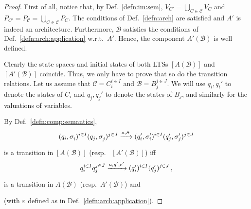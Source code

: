 \documentclass{llncs}
\newcommand{\defn}[1]{Def.~\ref{defn:#1}}
\newcommand{\cB}{\ensuremath{\mathcal{B}}}
\newcommand{\cC}{\ensuremath{\mathcal{C}}}
\newcommand{\wrt}[1][\ ]{w.r.t.#1}
\newcommand{\resp}[1][\ ]{resp.#1}
\newcommand{\goesto}[2][]{\ensuremath{\xrightarrow[{#1}\relax]{#2}}}
\newcommand{\val}[3][]{\ensuremath{#1{\sigma}^{#2}_{#3}}}
\newcommand{\export}[1][]{\ensuremath{\varepsilon_{#1}}}
\newcommand{\valdiff}[2]{\ensuremath{#1 \triangle #2}}
\newcommand{\semopen}[1]{\ensuremath{[{#1}]}}
\begin{document}
\begin{proof}
  First of all, notice that, by \defn{im:sem},
  $V_{C'} = \bigcup_{C \in \cC} V_C$ and $P_{C'} = P_\cC = \bigcup_{C \in \cC} P_C$.
  The conditions of \defn{arch} are satisfied and $A'$ is indeed
  an architecture.  Furthermore, $\cB$ satisfies the conditions
  of \defn{arch:application} \wrt $A'$.  Hence, the component
  $A'(\cB)$ is well defined.

  Clearly the state spaces and initial states %
  of both LTSs $\semopen{A(\cB)}$ and $\semopen{A'(\cB)}$
  coincide.  Thus, we only have to prove that so do the
  transition relations.  Let us assume that
  $\cC = C_i^{i \in I}$ and $\cB = B_j^{j \in J}$.
  We will use $q_i, q_i'$ to denote the states of
  $C_i$ and $q_j, q_j'$ to denote the states of $B_j$,
  and similarly for the valuations of variables.

  By \defn{comp:semantics},
%
  \begin{equation}
    \label{eq:lem1:trans:sem}
    (q_i, \val{}{i})^{i \in I} (q_j, \val{}{j})^{j \in J}
    \goesto{a, \val[\tilde]{}{}}
    (q_i', \val{\prime}{i})^{i \in I}
    (q_j', \val{\prime}{j})^{j \in J}
  \end{equation}
%  
  is a transition in $\semopen{A(\cB)}$ (\resp
  $\semopen{A'(\cB)}$) iff
%
  \begin{equation}
    \label{eq:lem1:trans}
    q_i^{i \in I} q_j^{j \in J}
    \goesto{a, g', e'}
    (q_i')^{i \in I} (q_j')^{j \in J}
    \,,
  \end{equation}
%
  is a transition in $A(\cB)$ (\resp $A'(\cB)$) and
%
%
  (with $\export$ defined as in \defn{arch:application}).


\end{proof}
\end{document}
